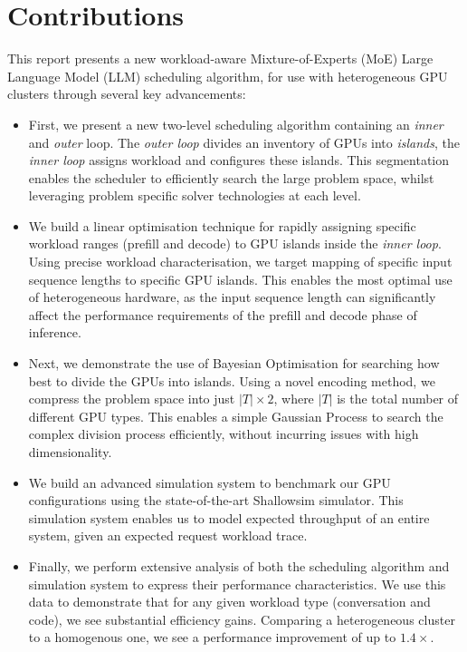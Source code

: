 \section{Contributions}

This report presents a new workload-aware Mixture-of-Experts (MoE) Large Language Model (LLM) scheduling algorithm, for use with heterogeneous GPU clusters through several key advancements:

\begin{itemize}
	\item First, we present a new two-level scheduling algorithm containing an \textit{inner} and \textit{outer} loop. The \textit{outer loop} divides an inventory of GPUs into \textit{islands}, the \textit{inner loop} assigns workload and configures these islands. This segmentation enables the scheduler to efficiently search the large problem space, whilst leveraging problem specific solver technologies at each level.

	\item We build a linear optimisation technique for rapidly assigning specific workload ranges (prefill and decode) to GPU islands inside the \textit{inner loop}. Using precise workload characterisation, we target mapping of specific input sequence lengths to specific GPU islands. This enables the most optimal use of heterogeneous hardware, as the input sequence length can significantly affect the performance requirements of the prefill and decode phase of inference.

	\item Next, we demonstrate the use of Bayesian Optimisation for searching how best to divide the GPUs into islands. Using a novel encoding method, we compress the problem space into just \( |T| \times 2 \), where  \( |T| \) is the total number of different GPU types. This enables a simple Gaussian Process to search the complex division process efficiently, without incurring issues with high dimensionality.

	\item We build an advanced simulation system to benchmark our GPU configurations using the state-of-the-art Shallowsim \autocite{icezack12Icezack12Shallowsim2025} simulator. This simulation system enables us to model expected throughput of an entire system, given an expected request workload trace.

	\item Finally, we perform extensive analysis of both the scheduling algorithm and simulation system to express their performance characteristics. We use this data to demonstrate that for any given workload type (conversation and code), we see substantial efficiency gains. Comparing a heterogeneous cluster to a homogenous one, we see a performance improvement of up to $1.4\times$.

\end{itemize}

